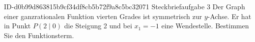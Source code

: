 \begin{exercise}
      {ID-d0b99d863815b9cf34df8cb5b72f9a8c5bc32071}
      {Steckbriefaufgabe 3}
  \ifproblem\problem
    Der Graph einer ganzrationalen Funktion vierten Grades ist symmetrisch
    zur $y$-Achse. Er hat in Punkt $P(\num{2}\mid\num{0})$ die Steigung
    \num{2} und bei $x_1=\num{-1}$ eine Wendestelle. Bestimmen Sie den
    Funktionsterm.
  \fi
\end{exercise}
